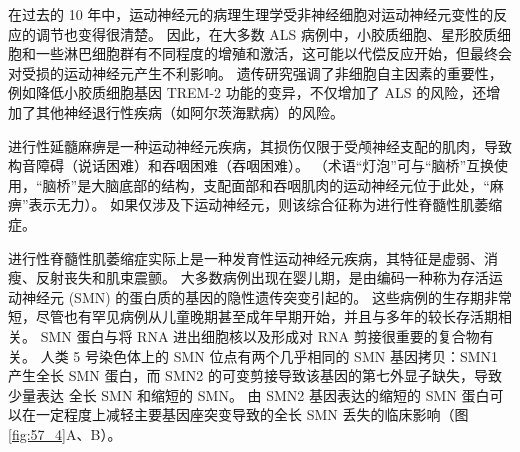 在过去的 10 年中，运动神经元的病理生理学受非神经细胞对运动神经元变性的反应的调节也变得很清楚。 因此，在大多数 ALS 病例中，小胶质细胞、星形胶质细胞和一些淋巴细胞群有不同程度的增殖和激活，这可能以代偿反应开始，但最终会对受损的运动神经元产生不利影响。 遗传研究强调了非细胞自主因素的重要性，例如降低小胶质细胞基因 TREM-2 功能的变异，不仅增加了 ALS 的风险，还增加了其他神经退行性疾病（如阿尔茨海默病）的风险。

进行性延髓麻痹是一种运动神经元疾病，其损伤仅限于受颅神经支配的肌肉，导致构音障碍（说话困难）和吞咽困难（吞咽困难）。 （术语“灯泡”可与“脑桥”互换使用，“脑桥”是大脑底部的结构，支配面部和吞咽肌肉的运动神经元位于此处，“麻痹”表示无力）。 如果仅涉及下运动神经元，则该综合征称为进行性脊髓性肌萎缩症。

进行性脊髓性肌萎缩症实际上是一种发育性运动神经元疾病，其特征是虚弱、消瘦、反射丧失和肌束震颤。 大多数病例出现在婴儿期，是由编码一种称为存活运动神经元 (SMN) 的蛋白质的基因的隐性遗传突变引起的。 这些病例的生存期非常短，尽管也有罕见病例从儿童晚期甚至成年早期开始，并且与多年的较长存活期相关。 SMN 蛋白与将 RNA 进出细胞核以及形成对 RNA 剪接很重要的复合物有关。 人类 5 号染色体上的 SMN 位点有两个几乎相同的 SMN 基因拷贝：SMN1 产生全长 SMN 蛋白，而 SMN2 的可变剪接导致该基因的第七外显子缺失，导致少量表达 全长 SMN 和缩短的 SMN。 由 SMN2 基因表达的缩短的 SMN 蛋白可以在一定程度上减轻主要基因座突变导致的全长 SMN 丢失的临床影响（图 \ref{fig:57_4}A、B）。

